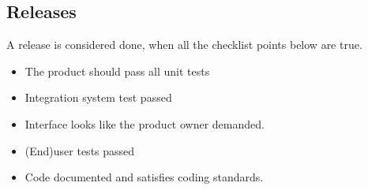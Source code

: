 \documentclass{article}
\begin{document}
\subsection{Releases}
A release is considered done, when all the checklist points below are true.
\begin{itemize}
	\item The product should pass all unit tests
	\item Integration system test passed
	\item Interface looks like the product owner demanded.
	\item (End)user tests passed
	\item Code documented and satisfies coding standards.
\end{itemize}
\clearpage
\printglossaries
\end{document}
